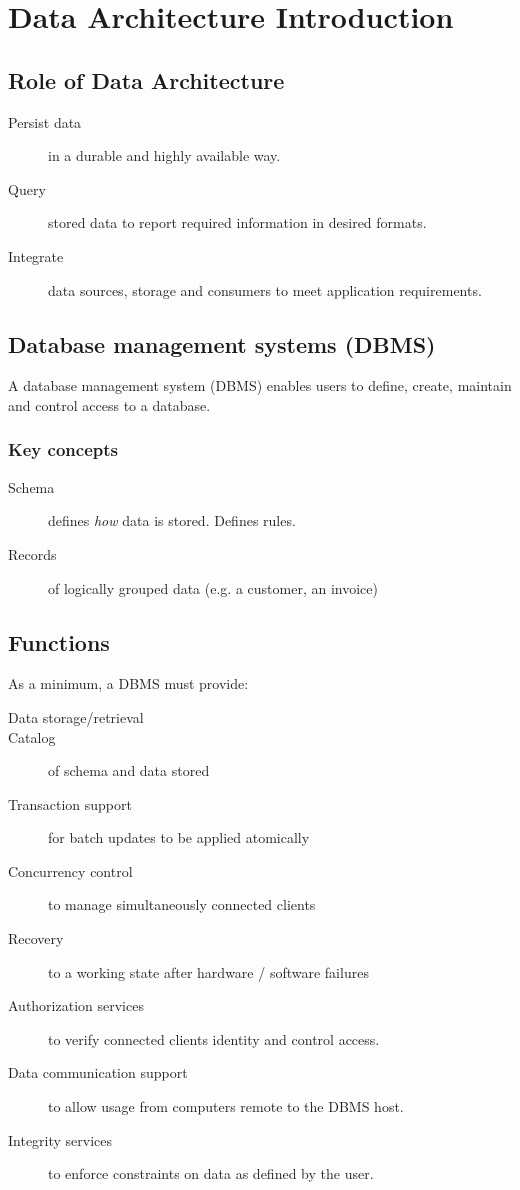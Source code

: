 \chapter{Data Architecture Introduction}


\section{Role of Data Architecture}

\begin{description}
\item[Persist data] in a durable and highly available way.
\item[Query] stored data to report required information in desired formats.
\item[Integrate] data sources, storage and consumers to meet application requirements.
\end{description}


\section{Database management systems (DBMS)}\label{sec:dbms}

A database management system (DBMS) enables users to define, create, maintain and control access to a database.

\subsection{Key concepts}

\begin{description}
\item[Schema] defines \textit{how} data is stored. Defines rules.
\item[Records] of logically grouped data (e.g. a customer, an invoice)
\end{description}


\section{Functions}

As a minimum, a DBMS must provide:

\begin{description}
\item[Data storage/retrieval] 
\item[Catalog] of schema and data stored
\item[Transaction support] for batch updates to be applied atomically
\item[Concurrency control] to manage simultaneously connected clients
\item[Recovery] to a working state after hardware / software failures
\item[Authorization services] to verify connected clients identity and control access.
\item[Data communication support] to allow usage from computers remote to the DBMS host.
\item[Integrity services] to enforce constraints on data as defined by the user.
\end{description}


